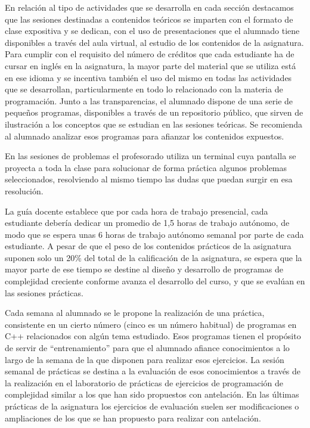\documentclass[twocolumn,twoside,a4paper, 10pt]{article}
\begin{document}
En relación al tipo de actividades que se desarrolla en cada sección destacamos que 
las sesiones destinadas a contenidos teóricos se imparten con el formato de clase expositiva y se dedican, 
con el uso de presentaciones que el alumnado tiene disponibles a través del aula virtual, al estudio de los 
contenidos de la asignatura. 
Para cumplir con el requisito del número de créditos que cada estudiante ha de cursar en inglés en la 
asignatura, la mayor parte del material que se utiliza está en ese idioma y se incentiva 
también el uso del mismo en todas las actividades que se desarrollan, particularmente en todo lo relacionado 
con la materia de programación.
Junto a las transparencias, el alumnado dispone de una serie de pequeños programas, disponibles a través de un
repositorio público, que sirven de ilustración a los conceptos que se estudian en las sesiones teóricas. 
Se recomienda al alumnado analizar esos programas para afianzar los contenidos expuestos.

En las sesiones de problemas el profesorado utiliza un terminal cuya pantalla se proyecta a toda la clase para
solucionar de forma práctica algunos problemas seleccionados, resolviendo al mismo tiempo las dudas que puedan 
surgir en esa resolución. 

La guía docente establece que por cada hora de trabajo presencial, cada estudiante debería dedicar un promedio
de 1,5 horas de trabajo autónomo, de modo que se espera unas 6 horas de trabajo autónomo semanal por 
parte de cada estudiante. 
A pesar de que el peso de los contenidos prácticos de la asignatura suponen solo un 20\% del total de la
calificación de la asignatura, se espera que la mayor parte de ese tiempo se destine al diseño y desarrollo 
de programas de complejidad creciente conforme avanza el desarrollo del curso, y que se evalúan en las
sesiones prácticas.

Cada semana al alumnado se le propone la realización de una práctica, consistente en un cierto número (cinco
es un número habitual) de programas en C++ relacionados con algún tema estudiado.
Esos programas tienen el propósito de servir de ``entrenamiento'' para que el alumnado afiance conocimientos a
lo largo de la semana de la que disponen para realizar esos ejercicios.
La sesión semanal de prácticas se destina a la evaluación de esos conocimientos a través de la realización en
el laboratorio de prácticas de ejercicios de programación de complejidad similar a los que han sido propuestos 
con antelación.
En las últimas prácticas de la asignatura los ejercicios de evaluación suelen ser modificaciones o
ampliaciones de los que se han propuesto para realizar con antelación.
\end{document}
